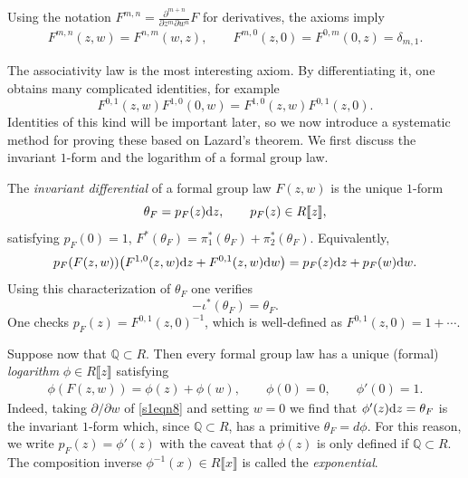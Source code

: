\documentclass[10pt,a4paper]{amsart}
\numberwithin{equation}{section}
\theoremstyle{definition}
\def\lb{\llbracket}
\def\rb{\rrbracket}
\begin{document}
Using the notation $F^{m,n}=\frac{\partial^{m+n}}{\partial z^m\partial w^n}F$ for derivatives, the axioms imply
\begin{align*}
 F^{m,n}(z,w)=F^{n,m}(w,z),\qquad
 F^{m,0}(z,0)=F^{0,m}(0,z)=\delta_{m,1}.
\end{align*}

The associativity law is the most interesting axiom. By differentiating it, one obtains many complicated identities, for example
\begin{equation}
\label{ComplicatedIdentity}
F^{0,1}(z,w)F^{1,0}(0,w)=F^{1,0}(z,w)F^{0,1}(z,0).
\end{equation}
Identities of this kind will be important later, so we now introduce a systematic method for proving these based on Lazard's theorem. We first discuss the invariant $1$-form and the logarithm of a formal group law.

The \emph{invariant differential} of a formal group law $F(z,w)$ is the unique $1$-form
\begin{equation}\label{Invariant_One_Form}
 \theta_F=p_F(z){\rm d}z,\qquad p_F(z)\in R\lb z\rb,
\end{equation}
satisfying
$
 p_F(0)=1$, $ F^*(\theta_F)=\pi_1^*(\theta_F)+\pi_2^*(\theta_F)$.
Equivalently,
\begin{equation}
\label{Invariant_One_Form_Equivalent_Char}
 p_F(F(z,w))\bigl(F^{1,0}(z,w){\rm d}z+F^{0,1}(z,w){\rm d}w\bigr)=p_F(z){\rm d}z+p_F(w){\rm d}w.
\end{equation}
Using this characterization of $\theta_F$ one verifies
\begin{equation}
\label{Invariant_Form_Inverse}
 -\iota^*(\theta_F)=\theta_F.
\end{equation}
One checks $p_F(z)=F^{0,1}(z,0)^{-1}$, which is well-defined as $F^{0,1}(z,0)=1+\cdots$.

Suppose now that $\mathbb{Q}\subset R$. Then every formal group law has a unique (formal) \emph{logarithm} $\phi\in R\lb z\rb$ satisfying
\begin{align}
\label{s1eqn8}
 \phi(F(z,w))=\phi(z)+\phi(w), \qquad\phi(0)=0, \qquad\phi'(0)=1.
\end{align}
Indeed, taking $\partial/\partial w$ of \eqref{s1eqn8} and setting $w=0$ we find that $\phi'(z){\rm d}z=\theta_F$ is the invariant $1$-form which, since $\mathbb{Q}\subset R$, has a primitive $\theta_F=d\phi$. For this reason, we write $p_F(z)=\phi'(z)$ with the caveat that $\phi(z)$ is only defined if $\mathbb{Q}\subset R$.
The composition inverse $\phi^{-1}(x)\in R\lb x\rb$ is called the \emph{exponential}.
\end{document}
